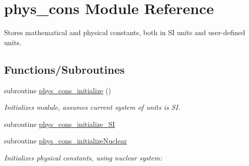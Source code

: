 \hypertarget{namespacephys__cons}{
\section{phys\_\-cons Module Reference}
\label{namespacephys__cons}
}


Stores mathematical and physical constants, both in SI units and user-\/defined units.  


\subsection*{Functions/Subroutines}
\begin{DoxyCompactItemize}
\item 
subroutine \hyperlink{namespacephys__cons_a2197fe7eff35572113dcf41a6493794c}{phys\_\-cons\_\-initialize} ()
\begin{DoxyCompactList}\small\item\em Initializes module, assumes current system of units is SI. \item\end{DoxyCompactList}\item 
subroutine \hyperlink{namespacephys__cons_abfc9a7567c3e76fdbbad91b88b46426e}{phys\_\-cons\_\-initialize\_\-SI}
\item 
subroutine \hyperlink{namespacephys__cons_ab13f84d8b6f574eb73870a2964a82b8b}{phys\_\-cons\_\-initializeNuclear}
\begin{DoxyCompactList}\small\item\em Initializes physical constants, using nuclear system: \item\end{DoxyCompactList}\end{DoxyCompactItemize}
